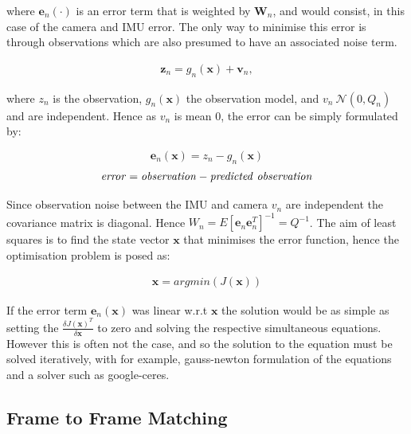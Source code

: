 \documentclass[11pt,twoside]{report}
\begin{document}
where $\textbf{e}_{n}(\cdot)$ is an error term that is weighted by $\textbf{W}_{n}$, and would consist, in this case of the camera and IMU error. The only way to minimise this error is through observations which are also presumed to have an associated noise term.

\begin{equation}
\begin{aligned}
\textbf{z}_{n} = g_{n}(\textbf{x}) + \textbf{v}_{n},
\end{aligned}
\end{equation} 

where $z_{n}$ is the observation, $g_{n}(\textbf{x})$ the observation model, and $v_{n} ~ \mathcal{N}(0,Q_{n})$ and are independent. Hence as $v_{n}$ is mean 0, the error can be simply formulated by:

\begin{equation}
\textbf{e}_{n}(\textbf{x}) = z_{n} - g_{n}(\textbf{x})
\end{equation}
\begin{equation}
\mathit{error = observation - predicted \textnormal{ } observation}
\end{equation}

Since observation noise between the IMU and camera $v_{n}$ are independent the covariance matrix is diagonal. Hence $W_{n} = E[\mathbf{e}_{n} \mathbf{e}_{n}^{T}]^{-1} = Q^{-1}$. The aim of least squares is to find the state vector $\mathbf{x}$ that minimises the error function, hence the optimisation problem is posed as:

\begin{equation}
\begin{aligned}
\textbf{x} = argmin(J(\mathbf{x}))
\end{aligned}
\end{equation}

If the error term $\mathbf{e}_{n}(\mathbf{x})$ was linear w.r.t $\mathbf{x}$ the solution would be as simple as setting the $\frac{\delta J(\mathbf{x})^{T}}{\delta \mathbf{x}}$ to zero and solving the respective simultaneous equations. However this is often not the case, and so the solution to the equation must be solved iteratively, with for example, gauss-newton formulation of the equations and a solver such as google-ceres.

\subsection{Frame to Frame Matching}\label{BRISK_section}
\end{document}
